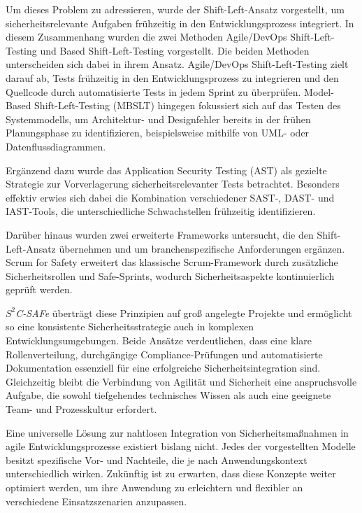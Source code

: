\documentclass[acmtog]{acmart}
\begin{document}
Um dieses Problem zu adressieren, wurde der Shift-Left-Ansatz vorgestellt, um sicherheitsrelevante Aufgaben frühzeitig in den Entwicklungsprozess integriert. \cite{dawoud_better_2024}
In diesem Zusammenhang wurden die zwei Methoden Agile/DevOps Shift-Left-Testing und Based Shift-Left-Testing vorgestellt. 
Die beiden Methoden unterscheiden sich dabei in ihrem Ansatz. 
Agile/DevOps Shift-Left-Testing zielt darauf ab, Tests frühzeitig in den Entwicklungsprozess zu integrieren und den Quellcode durch automatisierte Tests in jedem Sprint zu überprüfen. \cite{rani_shift-left_2023}
Model-Based Shift-Left-Testing (MBSLT) hingegen fokussiert sich auf das Testen des Systemmodells, um Architektur- und Designfehler bereits in der frühen Planungsphase zu identifizieren, beispielsweise mithilfe von UML- oder Datenflussdiagrammen. \cite{rani_shift-left_2023}

Ergänzend dazu wurde das Application Security Testing (AST) als gezielte Strategie zur Vorverlagerung sicherheitsrelevanter Tests betrachtet. 
Besonders effektiv erwies sich dabei die Kombination verschiedener SAST-, DAST- und IAST-Tools, die unterschiedliche Schwachstellen frühzeitig identifizieren. \cite{mateo_tudela_combining_2020}

Darüber hinaus wurden zwei erweiterte Frameworks untersucht, die den Shift-Left-Ansatz übernehmen und um branchenspezifische Anforderungen ergänzen. 
Scrum for Safety erweitert das klassische Scrum-Framework durch zusätzliche Sicherheitsrollen und Safe-Sprints, wodurch Sicherheitsaspekte kontinuierlich geprüft werden. \cite{barbareschi_scrum_2022}

\textit{$S^2$C-SAFe} überträgt diese Prinzipien auf groß angelegte Projekte und ermöglicht so eine konsistente Sicherheitsstrategie auch in komplexen Entwicklungsumgebungen. 
Beide Ansätze verdeutlichen, dass eine klare Rollenverteilung, durchgängige Compliance-Prüfungen und automatisierte Dokumentation essenziell für eine erfolgreiche Sicherheitsintegration sind. 
Gleichzeitig bleibt die Verbindung von Agilität und Sicherheit eine anspruchsvolle Aufgabe, die sowohl tiefgehendes technisches Wissen als auch eine geeignete Team- und Prozesskultur erfordert. \cite{moyon_how_2020} 

Eine universelle Lösung zur nahtlosen Integration von Sicherheitsmaßnahmen in agile Entwicklungsprozesse existiert bislang nicht. 
Jedes der vorgestellten Modelle besitzt spezifische Vor- und Nachteile, die je nach Anwendungskontext unterschiedlich wirken. 
Zukünftig ist zu erwarten, dass diese Konzepte weiter optimiert werden, um ihre Anwendung zu erleichtern und flexibler an verschiedene Einsatzszenarien anzupassen. 





\appendix
\end{document}
